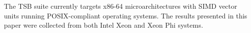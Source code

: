 \documentclass{sig-alternate-05-2015}
\begin{document}

The TSB suite currently targets x86-64 microarchitectures with SIMD vector units
  running POSIX-compliant operating systems.
The results presented in this paper were collected from both Intel Xeon and
  Xeon Phi systems.
\end{document}
